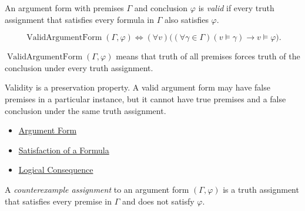 \begin{tcolorbox}[colback=propbox, colframe=propborder, arc=2pt,
  left=6pt, right=6pt, top=4pt, bottom=4pt,
  title={\small\textbf{Definition (Valid Argument Form)}},
  fonttitle=\small\bfseries]
\begin{definition}
\label{def:valid-argument-form-propositional-logic}
An argument form with premises \(\Gamma\) and conclusion \(\varphi\) is
\emph{valid} if every truth assignment that satisfies every formula in
\(\Gamma\) also satisfies \(\varphi\).
\end{definition}
\end{tcolorbox}

\begin{remark*}
\[
\operatorname{ValidArgumentForm}(\Gamma,\varphi)
\Longleftrightarrow
(\forall v)\bigl((\forall\gamma\in\Gamma)(v\models\gamma)
\to v\models\varphi\bigr).
\]
\end{remark*}

\begin{remark*}
\(\operatorname{ValidArgumentForm}(\Gamma,\varphi)\) means that truth of all
premises forces truth of the conclusion under every truth assignment.
\end{remark*}

\begin{remark*}[Interpretation]
Validity is a preservation property. A valid argument form may have false
premises in a particular instance, but it cannot have true premises and a false
conclusion under the same truth assignment.
\end{remark*}

\begin{dependencies}
\begin{itemize}
  \item \hyperref[def:argument-form-propositional-logic]{Argument Form}
  \item \hyperref[def:satisfaction-propositional-formula]{Satisfaction of a Formula}
  \item \hyperref[def:logical-consequence-propositional-logic]{Logical Consequence}
\end{itemize}
\end{dependencies}

\begin{tcolorbox}[colback=propbox, colframe=propborder, arc=2pt,
  left=6pt, right=6pt, top=4pt, bottom=4pt,
  title={\small\textbf{Definition (Counterexample Assignment)}},
  fonttitle=\small\bfseries]
\begin{definition}
\label{def:counterexample-assignment-propositional-logic}
A \emph{counterexample assignment} to an argument form \((\Gamma,\varphi)\) is a
truth assignment that satisfies every premise in \(\Gamma\) and does not satisfy
\(\varphi\).
\end{definition}
\end{tcolorbox}

